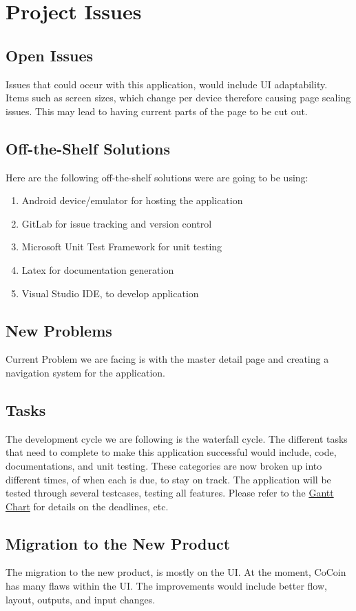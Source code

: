 \documentclass[12pt, titlepage]{article}
\begin{document}
\section{Project Issues}

\subsection{Open Issues}
Issues that could occur with this application, would include UI adaptability. Items such as screen sizes, which change per device therefore causing page scaling issues. This may lead to having current parts of the page to be cut out. 

\subsection{Off-the-Shelf Solutions}
Here are the following off-the-shelf solutions were are going to be using: 
   \begin{enumerate}
     \item Android device/emulator for hosting the application 
     \item GitLab for issue tracking and version control
	\item Microsoft Unit Test Framework for unit testing 
	 \item Latex for documentation generation
	\item Visual Studio IDE, to develop application

   \end{enumerate}

\subsection{New Problems}
Current Problem we are facing is with the master detail page and creating a navigation system for the application.
\subsection{Tasks}
The development cycle we are following is the waterfall cycle. The different tasks that need to complete to make this application successful would include, code, documentations, and unit testing. These categories are now broken up into different times, of when each is due, to stay on track. The application will be tested through several testcases, testing all features. Please refer to the \href{run:../../ProjectSchedule/3X_Example.gann}{Gantt Chart} for details on the deadlines, etc.
\subsection{Migration to the New Product}
The migration to the new product, is mostly on the UI. At the moment, CoCoin has many flaws within the UI. The improvements would include better flow, layout, outputs, and input changes. 
\end{document}
